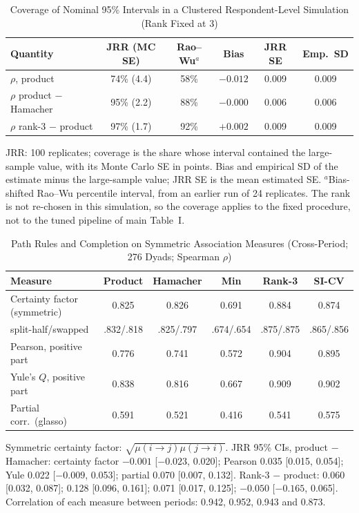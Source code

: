 \documentclass[journal]{IEEEtran}
\begin{document}
\setcounter{table}{9}\begin{table}[!t]
\caption{Coverage of Nominal 95\% Intervals in a Clustered Respondent-Level Simulation (Rank Fixed at 3)}
\centering
\scriptsize
\setlength{\tabcolsep}{2.5pt}
\begin{tabular}{@{}l c c c c c@{}}
\toprule
Quantity & JRR (MC SE) & Rao--Wu$^{a}$ & Bias & JRR SE & Emp.\ SD\\
\midrule
$\rho$, product & 74\% (4.4) & 58\% & $-0.012$ & 0.009 & 0.009\\
$\rho$ product $-$ Hamacher & 95\% (2.2) & 88\% & $-0.000$ & 0.006 & 0.006\\
$\rho$ rank-3 $-$ product & 97\% (1.7) & 92\% & $+0.002$ & 0.009 & 0.009\\
\bottomrule
\end{tabular}

\smallskip
\parbox{\columnwidth}{\scriptsize JRR: 100 replicates; coverage is the share whose interval contained the large-sample value, with its Monte Carlo SE in points. Bias and empirical SD of the estimate minus the large-sample value; JRR SE is the mean estimated SE. $^{a}$Bias-shifted Rao--Wu percentile interval, from an earlier run of 24 replicates. The rank is not re-chosen in this simulation, so the coverage applies to the fixed procedure, not to the tuned pipeline of main Table~I.}
\end{table}

\setcounter{table}{10}\begin{table}[!t]
\caption{Path Rules and Completion on Symmetric Association Measures (Cross-Period; 276 Dyads; Spearman $\rho$)}

\centering
\scriptsize
\setlength{\tabcolsep}{3pt}
\begin{tabular}{@{}l c c c c c@{}}
\toprule
Measure & Product & Hamacher & Min & Rank-3 & SI-CV\\
\midrule
Certainty factor (symmetric) & 0.825 & 0.826 & 0.691 & 0.884 & 0.874\\
\quad split-half/swapped & .832/.818 & .825/.797 & .674/.654 & .875/.875 & .865/.856\\
Pearson, positive part & 0.776 & 0.741 & 0.572 & 0.904 & 0.895\\
Yule's $Q$, positive part & 0.838 & 0.816 & 0.667 & 0.909 & 0.902\\
Partial corr.\ (glasso) & 0.591 & 0.521 & 0.416 & 0.541 & 0.575\\
\bottomrule
\end{tabular}

\smallskip
\parbox{\columnwidth}{\footnotesize Symmetric certainty factor: $\sqrt{\mu(i\to j)\mu(j\to i)}$. JRR 95\% CIs, product $-$ Hamacher: certainty factor $-0.001$ [$-0.023$, 0.020]; Pearson 0.035 [0.015, 0.054]; Yule 0.022 [$-0.009$, 0.053]; partial 0.070 [0.007, 0.132]. Rank-3 $-$ product: 0.060 [0.032, 0.087]; 0.128 [0.096, 0.161]; 0.071 [0.017, 0.125]; $-0.050$ [$-0.165$, 0.065]. Correlation of each measure between periods: 0.942, 0.952, 0.943 and 0.873.}
\end{table}
\end{document}
